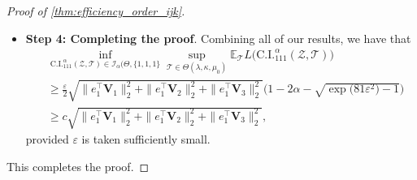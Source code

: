 \documentclass[10pt]{article}
\newcommand{\0}{{\mathbf{0}}}
\newcommand{\1}{{\mathbf{1}}}
\renewcommand{\t}{^{\top}}
\newcommand{\eps}{\varepsilon}
\begin{document}
\begin{proof}[Proof of \cref{thm:efficiency_order_ijk}]
\begin{itemize}
\begin{align*}
     &\geq \eps \sqrt{\| e_1 \t \mathbf{V}_1 \|_2^2 + \| e_1 \t \mathbf{V}_2 \|_2^2 +\| e_1 \t \mathbf{V}_3 \|_2^2}.
\end{align*}
In addition, we recall that we have assumed that $\mathcal{T}$ was selected such that
\begin{align*}
    \sqrt{\| e_1 \t \mathbf{V}_1 \|_2^2 + \| e_1 \t \mathbf{V}_2 \|_2^2 +\| e_1 \t \mathbf{V}_3 \|_2^2} &\geq C \mu_0 \frac{r_{\max}^{3/2} \kappa}{\lambda \sqrt{p_{\min}}},
\end{align*}
which is possible whenever $\lambda \geq C_0 r_{\max} \kappa$, which holds under the assumption $\lambda \geq C_0 \kappa \sqrt{p_{\max} }$ and the assumption $r_{\max} \leq p_{\min}^{1/2}$. Therefore,
\begin{align*}
    | \mathcal{T}_{ijk} - \mathcal{\bar T}_{ijk} | %
    &\geq \frac{\eps}{2} \sqrt{\| e_1 \t \mathbf{V}_1 \|_2^2 + \| e_1 \t \mathbf{V}_2 \|_2^2 +\| e_1 \t \mathbf{V}_3 \|_2^2}.
\end{align*}
    \item \textbf{Step 4: Completing the proof}.
    Combining all of our results, we have that
    \begin{align*}
          &\inf_{\mathrm{C.I.}^{\alpha}_{111} (\mathcal{Z},\mathcal{T}) \in \mathcal{I}_{\alpha}(\Theta,\{1,1,1\}} \sup_{\mathcal{T} \in \Theta(\lambda,\kappa,\mu_0)} \mathbb{E}_{\mathcal{T}} L\big( \mathrm{C.I.}_{111}^{\alpha}(\mathcal{Z},\mathcal{T}) \big)\\
          &\geq \frac{\eps}{2}\sqrt{\| e_1 \t \mathbf{V}_1 \|_2^2 + \| e_1 \t \mathbf{V}_2 \|_2^2 +\| e_1 \t \mathbf{V}_3 \|_2^2}  \big( 1 - 2 \alpha - \sqrt{\exp\bigg(81 \eps^2 \bigg) - 1} \big) \\
          &\geq c \sqrt{\| e_1 \t \mathbf{V}_1 \|_2^2 + \| e_1 \t \mathbf{V}_2 \|_2^2 +\| e_1 \t \mathbf{V}_3 \|_2^2},
    \end{align*}
    provided $\eps$ is taken sufficiently small. 
\end{itemize}
This completes the proof.    
\end{proof}

%
%
%
\end{document}

